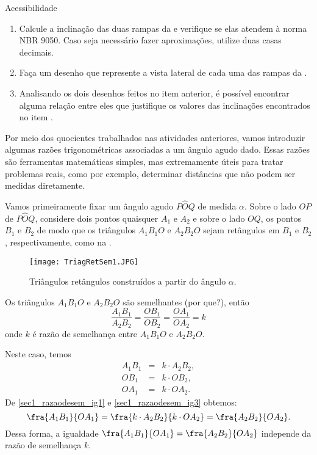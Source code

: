 \begin{task}{Acessibilidade}
\begin{enumerate}
\item{}
Calcule a inclinação das duas rampas da  e verifique se elas atendem à norma NBR 9050. Caso seja necessário fazer aproximações, utilize duas casas decimais.

\item{}
Faça um desenho que represente a vista lateral de cada uma das rampas da . 

\item{}  
Analisando os dois desenhos feitos no item anterior, é possível encontrar alguma relação entre eles que justifique os valores das inclinações encontrados no item .
\end{enumerate}

\end{task}


Por meio dos quocientes trabalhados nas atividades anteriores, vamos introduzir algumas razões trigonométricas associadas a um ângulo agudo dado. Essas razões são ferramentas matemáticas simples, mas extremamente úteis para tratar problemas reais, como por exemplo, determinar distâncias que não podem ser medidas diretamente. 

Vamos primeiramente fixar um ângulo agudo $P\hat{O}Q$ de medida $\alpha$. Sobre o lado $OP$ de $P\hat{O}Q$, considere dois pontos quaisquer $A_1$ e $A_2$ e sobre o lado $OQ$, os pontos $B_1$ e $B_2$ de modo que os triângulos $A_1B_1O$ e $A_2B_2O$ sejam retângulos em $B_1$ e $B_2$, respectivamente, como na .

\begin{figure}[H]
    \centering
    \texttt{[image: TriagRetSem1.JPG]}
    \caption{Triângulos retângulos construídos a partir do ângulo $\alpha$.}
    \label{TriagRet1}
\end{figure}

Os triângulos $A_1B_1O$ e  $A_2B_2O$ são semelhantes (por que?), então
\begin{equation}
\frac{A_1B_1}{A_2B_2}=\frac{OB_1}{OB_2}=\frac{OA_1}{OA_2}=k \label{sec1_razaodesem}
\end{equation}
onde $k$ é razão de semelhança entre $A_1B_1O$ e $A_2B_2O$.

Neste caso, temos
\begin{eqnarray}
A_1B_1 & = & k \cdot A_2B_2, \label{sec1_razaodesem_ig1}\\ 
OB_1 & = & k \cdot OB_2,         \label{sec1_razaodesem_ig2} \\
OA_1 & = & k \cdot O A_2.         \label{sec1_razaodesem_ig3}
\end{eqnarray}
De \eqref{sec1_razaodesem_ig1} e \eqref{sec1_razaodesem_ig3} obtemos:
\begin{equation}
\fra{A_1B_1}{OA_1}=\fra{k\cdot A_2B_2}{k \cdot OA_2}=\fra{A_2B_2}{OA_2}. \label{sec1_razaodesem_ig4}
\end{equation}
Dessa forma, a igualdade $\fra{A_1B_1}{OA_1}=\fra{A_2B_2}{OA_2}$ independe da razão de semelhança $k$. 

